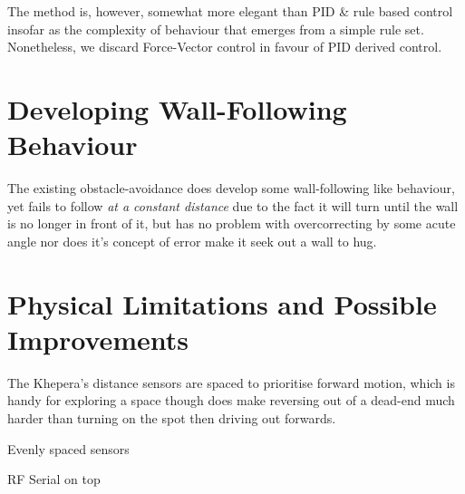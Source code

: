 \documentclass[11pt,a4wide]{article}
\begin{document}
The method is, however, somewhat more elegant than PID \& rule based control insofar 
as the complexity of behaviour that emerges from a simple rule set. Nonetheless, we 
discard Force-Vector control in favour of PID derived control.


\section{Developing Wall-Following Behaviour}

The existing obstacle-avoidance does develop some wall-following like behaviour, 
yet fails to follow \emph{at a constant distance} due to the fact it will turn until 
the wall is no longer in front of it, but has no problem with overcorrecting by 
some acute angle nor does it's concept of error make it seek out a wall to hug.


\section{Physical Limitations and Possible Improvements}

The Khepera's distance sensors are spaced to prioritise forward motion, which is handy 
for exploring a space though does make reversing out of a dead-end much harder than 
turning on the spot then driving out forwards.

Evenly spaced sensors

RF Serial on top
\end{document}
